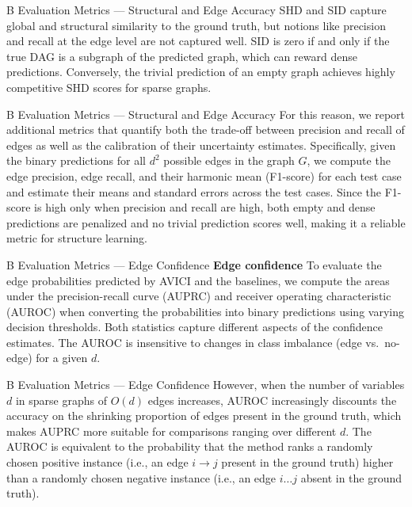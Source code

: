 \documentclass[aspectratio=169,10pt]{beamer}
\newcommand{\ours}{AVICI\xspace}
\begin{document}
\begin{frame}{B Evaluation Metrics --- Structural and Edge Accuracy}
\small
SHD and SID capture global and structural similarity to the ground truth, but notions like precision and recall at the edge level are not captured well. SID is zero if and only if the true DAG is a subgraph of the predicted graph, which can reward dense predictions. Conversely, the trivial prediction of an empty graph achieves highly competitive SHD scores for sparse graphs.
\end{frame}

\begin{frame}{B Evaluation Metrics --- Structural and Edge Accuracy}
\small
For this reason, we report additional metrics that quantify both the trade-off between precision and recall of edges as well as the calibration of their uncertainty estimates. Specifically, given the binary predictions for all $d^2$ possible edges in the graph $G$, we compute the edge precision, edge recall, and their harmonic mean (F1-score) for each test case and estimate their means and standard errors across the test cases. Since the F1-score is high only when precision and recall are high, both empty and dense predictions are penalized and no trivial prediction scores well, making it a reliable metric for structure learning.
\end{frame}

\begin{frame}{B Evaluation Metrics --- Edge Confidence}
\small
\textbf{Edge confidence}\quad
To evaluate the edge probabilities predicted by \ours and the baselines, we compute the areas under the precision-recall curve (AUPRC) and receiver operating characteristic (AUROC) when converting the probabilities into binary predictions using varying decision thresholds. Both statistics capture different aspects of the confidence estimates. The AUROC is insensitive to changes in class imbalance (edge vs.\ no-edge) for a given $d$.
\end{frame}

\begin{frame}{B Evaluation Metrics --- Edge Confidence}
\small
However, when the number of variables $d$ in sparse graphs of $O(d)$ edges increases, AUROC increasingly discounts the accuracy on the shrinking proportion of edges present in the ground truth, which makes AUPRC more suitable for comparisons ranging over different $d$. The AUROC is equivalent to the probability that the method ranks a randomly chosen positive instance (i.e., an edge $i \rightarrow j$ present in the ground truth) higher than a randomly chosen negative instance (i.e., an edge $i \dots j$ absent in the ground truth).
\end{frame}
\end{document}
